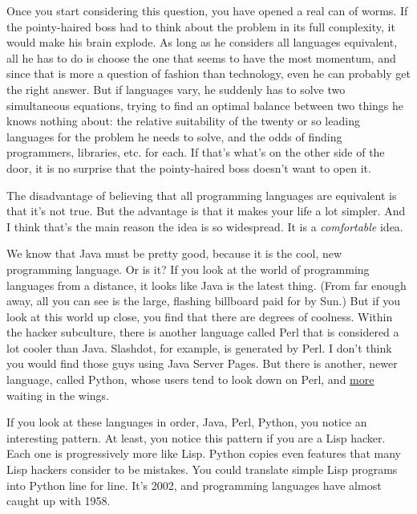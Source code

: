 Once you start
                  considering this question, you have opened a real can of
                  worms. If the pointy-haired boss had to think about the
                  problem in its full complexity, it would make his brain
                  explode. As long as he considers all languages equivalent, all
                  he has to do is choose the one that seems to have the most
                  momentum, and since that is more a question of fashion than
                  technology, even he can probably get the right answer. But if
                  languages vary, he suddenly has to solve two simultaneous
                  equations, trying to find an optimal balance between two
                  things he knows nothing about: the relative suitability of the
                  twenty or so leading languages for the problem he needs to
                  solve, and the odds of finding programmers, libraries, etc.
                  for each. If that's what's on the other side of the door, it
                  is no surprise that the pointy-haired boss doesn't want to
                  open it.

The disadvantage of believing that all
                  programming languages are equivalent is that it's not true.
                  But the advantage is that it makes your life a lot simpler.
                  And I think that's the main reason the idea is so widespread.
                  It is a \emph{comfortable} idea.

We know that Java
                  must be pretty good, because it is the cool, new programming
                  language. Or is it? If you look at the world of programming
                  languages from a distance, it looks like Java is the latest
                  thing. (From far enough away, all you can see is the large,
                  flashing billboard paid for by Sun.) But if you look at this
                  world up close, you find that there are degrees of coolness.
                  Within the hacker subculture, there is another language called
                  Perl that is considered a lot cooler than Java. Slashdot, for
                  example, is generated by Perl. I don't think you would find
                  those guys using Java Server Pages. But there is another,
                  newer language, called Python, whose users tend to look down
                  on Perl, and \href{http://www.paulgraham.com/accgen.html}{more} waiting in the
                  wings.

If you look at these languages in order,
                  Java, Perl, Python, you notice an interesting pattern. At
                  least, you notice this pattern if you are a Lisp hacker. Each
                  one is progressively more like Lisp. Python copies even
                  features that many Lisp hackers consider to be mistakes. You
                  could translate simple Lisp programs into Python line for
                  line. It's 2002, and programming languages have almost caught
                  up with 1958.

